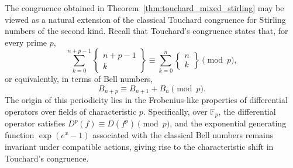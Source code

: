 \documentclass[12pt]{amsart}
\theoremstyle{definition}
\begin{document}
The congruence obtained in Theorem~\ref{thm:touchard_mixed_stirling} may be viewed as a natural extension of the classical Touchard congruence for Stirling numbers of the second kind. Recall that Touchard's congruence states that, for every prime $p$,
\begin{equation}\label{Touchard classical}
\sum_{k=0}^{n+p-1}
\left\{\begin{matrix}n+p-1\\k\end{matrix}\right\}
\equiv
\sum_{k=0}^{n}
\left\{\begin{matrix}n\\k\end{matrix}\right\}
\pmod p,
\end{equation}
or equivalently, in terms of Bell numbers,
\begin{equation}\label{Touchard Bell}
B_{n+p} \equiv B_{n+1} + B_n \pmod p.
\end{equation}
The origin of this periodicity lies in the Frobenius-like properties of differential operators over fields of characteristic $p$. Specifically, over $\mathbb{F}_p$, the differential operator satisfies $D^p(f) \equiv D(f^p) \pmod p$, and the exponential generating function $\exp(e^x-1)$ associated with the classical Bell numbers remains invariant under compatible actions, giving rise to the characteristic shift in Touchard's congruence.
\end{document}
